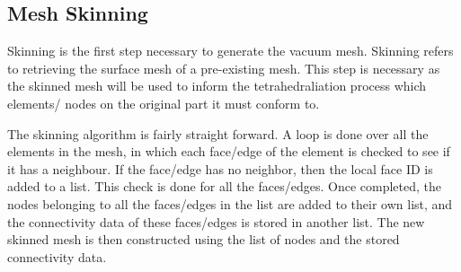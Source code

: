 \documentclass[12pt, letterpaper]{article}
\begin{document}
\subsection{Mesh Skinning}
Skinning is the first step necessary to generate the vacuum mesh. Skinning refers to retrieving the surface mesh of a pre-existing mesh. This step is necessary as the skinned mesh will be used to inform the tetrahedraliation process which elements/ nodes on the original part it must conform to.

The skinning algorithm is fairly straight forward. A loop is done over all the elements in the mesh, in which each face/edge of the element is checked to see if it has a neighbour. If the face/edge has no neighbor, then the local face ID is added to a list. This check is done for all the faces/edges. Once completed, the nodes belonging to all the faces/edges in the list are added to their own list, and the connectivity data of these faces/edges is stored in another list. The new skinned mesh is then constructed using the list of nodes and the stored connectivity data.
\end{document}
